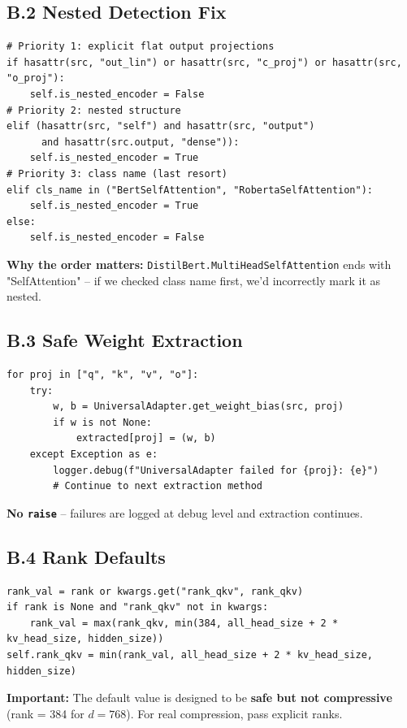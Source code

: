 \subsection{B.2 Nested Detection Fix}

\begin{lstlisting}
# Priority 1: explicit flat output projections
if hasattr(src, "out_lin") or hasattr(src, "c_proj") or hasattr(src, "o_proj"):
    self.is_nested_encoder = False
# Priority 2: nested structure
elif (hasattr(src, "self") and hasattr(src, "output") 
      and hasattr(src.output, "dense")):
    self.is_nested_encoder = True
# Priority 3: class name (last resort)
elif cls_name in ("BertSelfAttention", "RobertaSelfAttention"):
    self.is_nested_encoder = True
else:
    self.is_nested_encoder = False
\end{lstlisting}

\textbf{Why the order matters:} \texttt{DistilBert.MultiHeadSelfAttention} ends with 
"SelfAttention" -- if we checked class name first, we'd incorrectly mark it 
as nested.

\subsection{B.3 Safe Weight Extraction}

\begin{lstlisting}
for proj in ["q", "k", "v", "o"]:
    try:
        w, b = UniversalAdapter.get_weight_bias(src, proj)
        if w is not None:
            extracted[proj] = (w, b)
    except Exception as e:
        logger.debug(f"UniversalAdapter failed for {proj}: {e}")
        # Continue to next extraction method
\end{lstlisting}

\textbf{No \texttt{raise}} -- failures are logged at debug level and extraction continues.

\subsection{B.4 Rank Defaults}

\begin{lstlisting}
rank_val = rank or kwargs.get("rank_qkv", rank_qkv)
if rank is None and "rank_qkv" not in kwargs:
    rank_val = max(rank_qkv, min(384, all_head_size + 2 * kv_head_size, hidden_size))
self.rank_qkv = min(rank_val, all_head_size + 2 * kv_head_size, hidden_size)
\end{lstlisting}

\textbf{Important:} The default value is designed to be \textbf{safe but not compressive} 
(rank = 384 for $d=768$). For real compression, pass explicit ranks.


